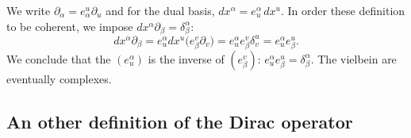 We write $\partial_{\alpha}=e_{\alpha}^u\partial_u$ and for the dual basis, $dx^{\alpha}=e^{\alpha}_u\,dx^u$. In order these definition to be coherent, we impose $dx^{\alpha}\partial_{\beta}=\delta^{\alpha}_{\beta}$:
\begin{equation}
  dx^{\alpha}\partial_{\beta}=e_u^{\alpha}dx^u\big( e^v_{\beta}\partial_v \big)
		=e^{\alpha}_ue^v_{\beta}\delta^u_v
		=e^{\alpha}_ue^u_{\beta}.
\end{equation}
We conclude that the  $(e^{\alpha}_u)$ is the inverse of $(e^v_{\beta})$: $e^{\alpha}_ue^u_{\beta}=\delta^{\alpha}_{\beta}$. The vielbein are eventually complexes.



\subsection{An other definition of the Dirac operator}

